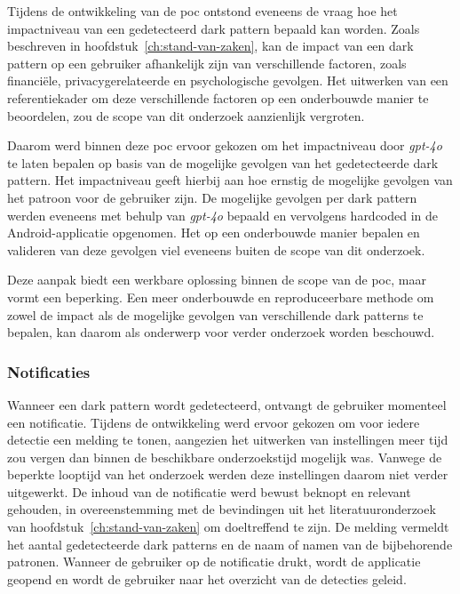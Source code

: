 \vspace{1em}

Tijdens de ontwikkeling van de \acrshort{poc} ontstond eveneens de vraag hoe het impactniveau van een gedetecteerd dark pattern bepaald kan worden. Zoals beschreven in hoofdstuk~\ref{ch:stand-van-zaken}, kan de impact van een dark pattern op een gebruiker afhankelijk zijn van verschillende factoren, zoals financiële, privacygerelateerde en psychologische gevolgen. Het uitwerken van een referentiekader om deze verschillende factoren op een onderbouwde manier te beoordelen, zou de scope van dit onderzoek aanzienlijk vergroten.

\vspace{1em}

Daarom werd binnen deze \acrshort{poc} ervoor gekozen om het impactniveau door \textit{gpt-4o} te laten bepalen op basis van de mogelijke gevolgen van het gedetecteerde dark pattern. Het impactniveau geeft hierbij aan hoe ernstig de mogelijke gevolgen van het patroon voor de gebruiker zijn. De mogelijke gevolgen per dark pattern werden eveneens met behulp van \textit{gpt-4o} bepaald en vervolgens hardcoded in de Android-applicatie opgenomen. Het op een onderbouwde manier bepalen en valideren van deze gevolgen viel eveneens buiten de scope van dit onderzoek.

\vspace{1em}

Deze aanpak biedt een werkbare oplossing binnen de scope van de \acrshort{poc}, maar vormt een beperking. Een meer onderbouwde en reproduceerbare methode om zowel de impact als de mogelijke gevolgen van verschillende dark patterns te bepalen, kan daarom als onderwerp voor verder onderzoek worden beschouwd.

\vspace{1em}

\subsubsection{Notificaties}

\vspace{1em}

Wanneer een dark pattern wordt gedetecteerd, ontvangt de gebruiker momenteel een notificatie. Tijdens de ontwikkeling werd ervoor gekozen om voor iedere detectie een melding te tonen, aangezien het uitwerken van instellingen meer tijd zou vergen dan binnen de beschikbare onderzoekstijd mogelijk was. Vanwege de beperkte looptijd van het onderzoek werden deze instellingen daarom niet verder uitgewerkt. De inhoud van de notificatie werd bewust beknopt en relevant gehouden, in overeenstemming met de bevindingen uit het literatuuronderzoek van hoofdstuk~\ref{ch:stand-van-zaken} om doeltreffend te zijn. De melding vermeldt het aantal gedetecteerde dark patterns en de naam of namen van de bijbehorende patronen. Wanneer de gebruiker op de notificatie drukt, wordt de applicatie geopend en wordt de gebruiker naar het overzicht van de detecties geleid.

